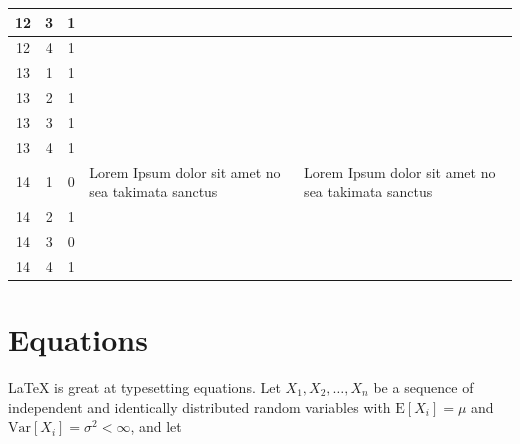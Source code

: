 \begin{landscape}
\begin{longtable}{|c|c|c|l|l|}
        12              & 3                      & 1               &                                                       &                                           \\ \hline
        12              & 4                      & 1               &                                                       &                                           \\ \hline
        13              & 1                      & 1               &                                                       &                                           \\ \hline
        13              & 2                      & 1               &                                                       &                                           \\ \hline
        13              & 3                      & 1               &                                                       &                                           \\ \hline
        13              & 4                      & 1               &                                                       &                                           \\ \hline
        14              & 1                      & 0               & Lorem Ipsum dolor sit amet no sea takimata sanctus & Lorem Ipsum dolor sit amet no sea takimata sanctus   \\ \hline
        14              & 2                      & 1               &                                                       &                                           \\ \hline
        14              & 3                      & 0              &                                                       &                                           \\ \hline
        14              & 4                      & 1               &                                                       &                                           \\ \hline
    \end{longtable}
\end{landscape}


\section{Equations}

\LaTeX{} is great at typesetting equations. Let $X_1, X_2, \ldots, X_n$ be a sequence of independent and identically distributed random variables with $\text{E}[X_i] = \mu$ and $\text{Var}[X_i] = \sigma^2 < \infty$, and let

